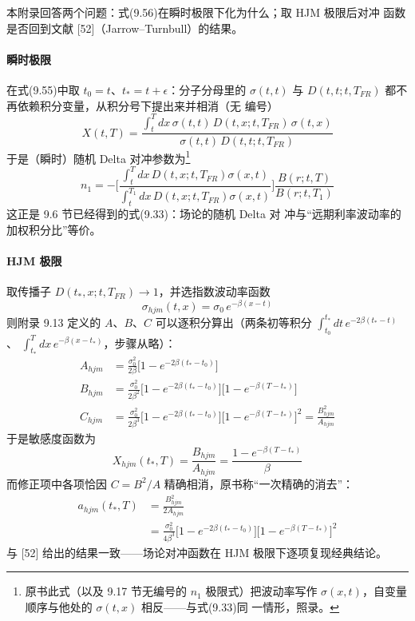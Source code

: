 本附录回答两个问题：式(9.56)在瞬时极限下化为什么；取 HJM 极限后对冲
函数是否回到文献 [52]（Jarrow--Turnbull）的结果。

\paragraph{瞬时极限}
在式(9.55)中取 $t_0=t$、$t_*=t+\epsilon$：分子分母里的 $\sigma(t,t)$
与 $D(t,t;t,T_{FR})$ 都不再依赖积分变量，从积分号下提出来并相消（无
编号）
\begin{equation*}
X(t,T)=\frac{\int_{t}^{T}dx\,\sigma(t,t)\,D(t,x;t,T_{FR})\,\sigma(t,x)}
{\sigma(t,t)\,D(t,t;t,T_{FR})}
\end{equation*}
于是（瞬时）随机 Delta 对冲参数为\footnote{原书此式（以及 9.17 节无编号的 $n_1$ 极限式）把波动率写作
$\sigma(x,t)$，自变量顺序与他处的 $\sigma(t,x)$ 相反——与式(9.33)同
一情形，照录。}
\begin{equation*}
n_1=-\biggl[\frac{\int_{t}^{T}dx\,D(t,x;t,T_{FR})\sigma(x,t)}
{\int_{t}^{T_1}dx\,D(t,x;t,T_{FR})\sigma(x,t)}\biggr]
\frac{B(r;t,T)}{B(r;t,T_1)}\tag{9.57}
\end{equation*}这正是 9.6 节已经得到的式(9.33)：场论的随机 Delta 对
冲与“远期利率波动率的加权积分比”等价。

\paragraph{HJM 极限}
取传播子 $D(t_*,x;t,T_{FR})\to1$，并选指数波动率函数
\begin{equation*}
\sigma_{hjm}(t,x)=\sigma_0\,e^{-\beta(x-t)}\tag{9.58}
\end{equation*}
则附录 9.13 定义的 $A$、$B$、$C$ 可以逐积分算出（两条初等积分
$\int_{t_0}^{t_*}dt\,e^{-2\beta(t_*-t)}$、
$\int_{t_*}^{T}dx\,e^{-\beta(x-t_*)}$，步骤从略）：
\begin{align*}
A_{hjm}&=\frac{\sigma_0^2}{2\beta}\bigl[1-e^{-2\beta(t_*-t_0)}\bigr]\\
B_{hjm}&=\frac{\sigma_0^2}{2\beta^2}\bigl[1-e^{-2\beta(t_*-t_0)}\bigr]
\bigl[1-e^{-\beta(T-t_*)}\bigr]\\
C_{hjm}&=\frac{\sigma_0^2}{2\beta^3}\bigl[1-e^{-2\beta(t_*-t_0)}\bigr]
\bigl[1-e^{-\beta(T-t_*)}\bigr]^2=\frac{B_{hjm}^2}{A_{hjm}}\tag{9.59}
\end{align*}
于是敏感度函数为
\begin{equation*}
X_{hjm}(t_*,T)=\frac{B_{hjm}}{A_{hjm}}
=\frac{1-e^{-\beta(T-t_*)}}{\beta}\tag{9.60}
\end{equation*}
而修正项中各项恰因 $C=B^2/A$ 精确相消，原书称“一次精确的消去”：
\begin{align*}
a_{hjm}(t_*,T)&=\frac{B_{hjm}^2}{2A_{hjm}}\\
&=\frac{\sigma_0^2}{4\beta^3}\bigl[1-e^{-2\beta(t_*-t_0)}\bigr]
\bigl[1-e^{-\beta(T-t_*)}\bigr]^2\tag{9.61}
\end{align*}
与 [52] 给出的结果一致——场论对冲函数在 HJM 极限下逐项复现经典结论。


